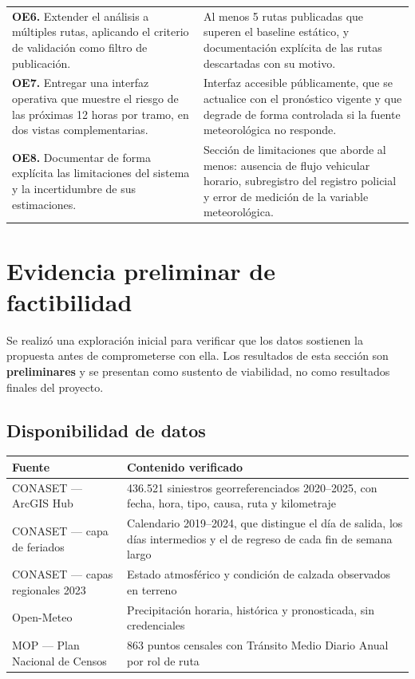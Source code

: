 \documentclass[11pt,a4paper]{article}
\begin{document}
\begin{longtable}[c]{p{}p{}}
\textbf{OE6.} Extender el análisis a múltiples rutas, aplicando el criterio de
validación como filtro de publicación.
& Al menos 5 rutas publicadas que superen el baseline estático, y documentación
explícita de las rutas descartadas con su motivo.\\
\addlinespace

\textbf{OE7.} Entregar una interfaz operativa que muestre el riesgo de las
próximas 12 horas por tramo, en dos vistas complementarias.
& Interfaz accesible públicamente, que se actualice con el pronóstico vigente y
que degrade de forma controlada si la fuente meteorológica no responde.\\
\addlinespace

\textbf{OE8.} Documentar de forma explícita las limitaciones del sistema y la
incertidumbre de sus estimaciones.
& Sección de limitaciones que aborde al menos: ausencia de flujo vehicular
horario, subregistro del registro policial y error de medición de la variable
meteorológica.\\

\end{longtable}

\section{Evidencia preliminar de factibilidad}
\label{sec:evidencia}

Se realizó una exploración inicial para verificar que los datos sostienen la
propuesta antes de comprometerse con ella. Los resultados de esta sección son
\textbf{preliminares} y se presentan como sustento de viabilidad, no como
resultados finales del proyecto.

\subsection{Disponibilidad de datos}

\begin{center}
\begin{tabular}{p{}p{}}
\toprule
\textbf{Fuente} & \textbf{Contenido verificado}\\
\midrule
CONASET --- ArcGIS Hub & 436.521 siniestros georreferenciados 2020--2025, con
fecha, hora, tipo, causa, ruta y kilometraje\\
\addlinespace
CONASET --- capa de feriados & Calendario 2019--2024, que distingue el día de
salida, los días intermedios y el de regreso de cada fin de semana largo\\
\addlinespace
CONASET --- capas regionales 2023 & Estado atmosférico y condición de calzada
observados en terreno\\
\addlinespace
Open-Meteo & Precipitación horaria, histórica y pronosticada, sin credenciales\\
\addlinespace
MOP --- Plan Nacional de Censos & 863 puntos censales con Tránsito Medio Diario
Anual por rol de ruta\\
\bottomrule
\end{tabular}
\end{center}
\end{document}
